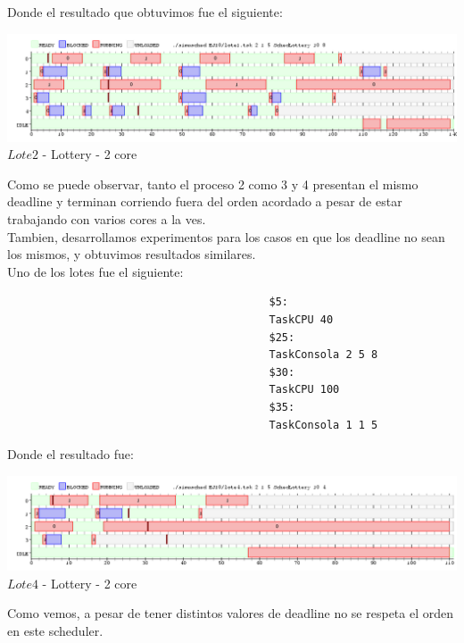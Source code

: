 Donde el resultado que obtuvimos fue el siguiente:\\

 \begin{center}
    	\includegraphics[width=450pt]{./ej10p7con.png}
	{$Lote 2$ - Lottery - 2 core}	
 \end{center}

\indent Como se puede observar, tanto el proceso 2 como 3 y 4 presentan el mismo deadline y terminan corriendo
fuera del orden acordado a pesar de estar trabajando con varios cores a la ves.\\

\indent Tambien, desarrollamos experimentos para los casos en que los deadline no sean los mismos, y obtuvimos
resultados similares.\\
Uno de los lotes fue el siguiente:

\begin{verbatim}
                                         $5:
                                         TaskCPU 40
                                         $25:
                                         TaskConsola 2 5 8
                                         $30:
                                         TaskCPU 100
                                         $35:
                                         TaskConsola 1 1 5

\end{verbatim}

Donde el resultado fue:\\

 \begin{center}
    	\includegraphics[width=450pt]{./ej10p12con.png}
	{$Lote 4$ - Lottery - 2 core}	
 \end{center}

 \indent Como vemos, a pesar de tener distintos valores de deadline no se respeta el orden en este scheduler.\\
